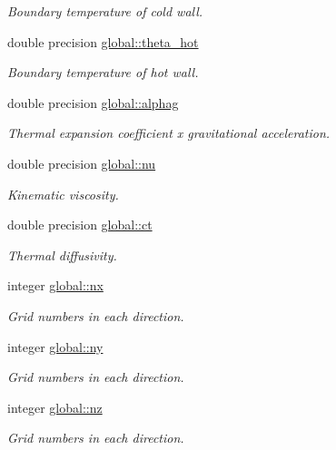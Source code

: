 \begin{DoxyCompactItemize}
\begin{DoxyCompactList}\small\item\em Boundary temperature of cold wall. \end{DoxyCompactList}\item 
double precision \mbox{\hyperlink{namespaceglobal_a63b846fbcd5aedd45f92a0b1eb972244}{global\+::theta\+\_\+hot}}
\begin{DoxyCompactList}\small\item\em Boundary temperature of hot wall. \end{DoxyCompactList}\item 
double precision \mbox{\hyperlink{namespaceglobal_abe54a711bf9d8c30a6debfb651bdf47d}{global\+::alphag}}
\begin{DoxyCompactList}\small\item\em Thermal expansion coefficient x gravitational acceleration. \end{DoxyCompactList}\item 
double precision \mbox{\hyperlink{namespaceglobal_a48babc9c7f07053917ca1392e7a7b721}{global\+::nu}}
\begin{DoxyCompactList}\small\item\em Kinematic viscosity. \end{DoxyCompactList}\item 
double precision \mbox{\hyperlink{namespaceglobal_acf5521de662915885b6a73718cd6314b}{global\+::ct}}
\begin{DoxyCompactList}\small\item\em Thermal diffusivity. \end{DoxyCompactList}\end{DoxyCompactItemize}
\textbf{ }\par
\begin{DoxyCompactItemize}
\item 
integer \mbox{\hyperlink{namespaceglobal_a4ba10a6dbbcebb68e0d5e36a6c291898}{global\+::nx}}
\begin{DoxyCompactList}\small\item\em Grid numbers in each direction. \end{DoxyCompactList}\item 
integer \mbox{\hyperlink{namespaceglobal_a12dd7ca24c7675f31e6de07b1769991c}{global\+::ny}}
\begin{DoxyCompactList}\small\item\em Grid numbers in each direction. \end{DoxyCompactList}\item 
integer \mbox{\hyperlink{namespaceglobal_ab8d7436a6037d4c1b7248107a2f07d76}{global\+::nz}}
\begin{DoxyCompactList}\small\item\em Grid numbers in each direction. \end{DoxyCompactList}\end{DoxyCompactItemize}


